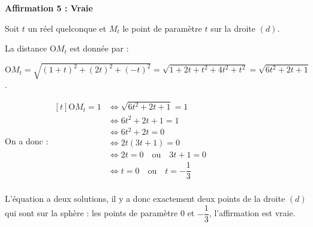 \documentclass[10pt]{article}
\begin{document}
\medskip


\textbf{Affirmation 5 : Vraie}

Soit $t$ un réel quelconque et $M_t$ le point de paramètre $t$ sur la droite $(d)$.

La distance $\mathrm{O}M_t$ est donnée par :

$\mathrm{O}M_t = \sqrt{(1 + t)^2 + (2t)^2 + (-t)^2} = \sqrt{1 + 2t + t^2 + 4t^2 + t^2} = \sqrt{6t^2 + 2t + 1} $.

On a donc : \quad $ \begin{aligned}[t] \mathrm{O}M_t = 1
	&\iff \sqrt{6t^2 + 2t + 1} = 1\\
	&\iff 6t^2 + 2t + 1 = 1 \\%
	&\iff 6t^2 + 2t = 0\\
	&\iff 2t(3t + 1) = 0\\
	&\iff 2t = 0 \quad \text{ou} \quad 3t + 1 = 0\\
	&\iff t = 0 \quad \text{ou} \quad t = -\dfrac{1}{3}\\
\end{aligned} $

L'équation a deux solutions, il y a donc exactement deux points de la droite $(d)$ qui sont sur la sphère : les points de paramètre 0 et $ -\dfrac{1}{3} $, l'affirmation est vraie.
\medskip
\end{document}

